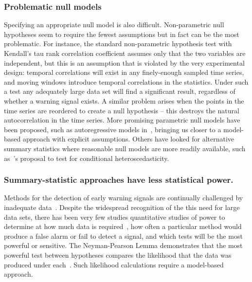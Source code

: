 \documentclass[authoryear,review,11pt]{elsarticle}
\begin{document}
\subsubsection*{Problematic null models}
Specifying an appropriate null model is also difficult.
Non-parametric null hypotheses seem to require the fewest assumptions but in fact can be the most problematic.
For instance, the standard non-parametric hypothesis test with Kendall's tau rank correlation coefficient
assumes only that the two variables are independent,
but this is an assumption that is violated by the very experimental design:
temporal correlations will exist in any finely-enough sampled time series,
and moving windows introduce temporal correlations in the statistics.
Under such a test any adequately large data set will find a significant result,
regardless of whether a warning signal exists.
A similar problem arises when the points in the time series are reordered to create a null hypothesis --
this destroys the natural autocorrelation in the time series.
More promising parametric null models have been proposed,
such as autoregressive models in~\citet{Dakos2008}, bringing us
closer to a model-based approach with explicit assumptions.
Others have looked for alternative summary statistics where
reasonable null models are more readily available,
such as~\citet{Seekell2011}'s proposal to test for conditional heteroscedasticity.

\subsubsection*{Summary-statistic approaches have less statistical power.}
Methods for the detection of early warning signals are continually challenged by inadequate data~\citep{Inman2011, Scheffer2010,Held2004, Dakos2008, Scheffer2009, Guttal2008, Carpenter2011, Bestelmeyer2011}.
Despite the widespread recognition of the this need for large data sets,
there has been very few studies quantitative studies of power to determine at how much data is required~\citep{Contamin2009},
how often a particular method would produce a false alarm or fail to detect a signal,
and which tests will be the most powerful or sensitive.
The Neyman-Pearson Lemma demonstrates that the most powerful test between hypotheses
compares the likelihood that the data was produced under each~\citep{Neyman1933}.
Such likelihood calculations require a model-based approach.
\end{document}
